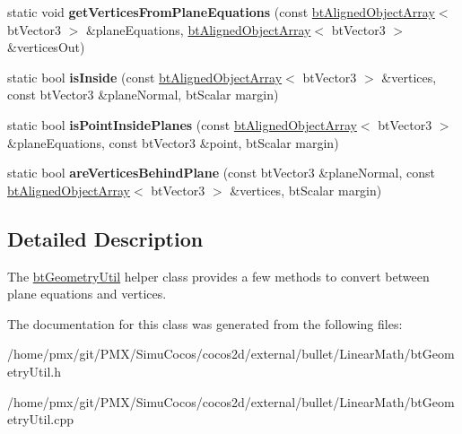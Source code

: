 \begin{DoxyCompactItemize}
\mbox{\label{classbtGeometryUtil_a6ebb88616a0cc480d88931ad0fa481b8}} 
static void {\bfseries get\+Vertices\+From\+Plane\+Equations} (const \hyperlink{classbtAlignedObjectArray}{bt\+Aligned\+Object\+Array}$<$ bt\+Vector3 $>$ \&plane\+Equations, \hyperlink{classbtAlignedObjectArray}{bt\+Aligned\+Object\+Array}$<$ bt\+Vector3 $>$ \&vertices\+Out)
\item 
\mbox{\label{classbtGeometryUtil_a2c6f6ac3418bb1790239f5483ccf1260}} 
static bool {\bfseries is\+Inside} (const \hyperlink{classbtAlignedObjectArray}{bt\+Aligned\+Object\+Array}$<$ bt\+Vector3 $>$ \&vertices, const bt\+Vector3 \&plane\+Normal, bt\+Scalar margin)
\item 
\mbox{\label{classbtGeometryUtil_af2dab175b0003b891a23069f69f12d88}} 
static bool {\bfseries is\+Point\+Inside\+Planes} (const \hyperlink{classbtAlignedObjectArray}{bt\+Aligned\+Object\+Array}$<$ bt\+Vector3 $>$ \&plane\+Equations, const bt\+Vector3 \&point, bt\+Scalar margin)
\item 
\mbox{\label{classbtGeometryUtil_acf1329c8b79f33e8f82c0f4328d66216}} 
static bool {\bfseries are\+Vertices\+Behind\+Plane} (const bt\+Vector3 \&plane\+Normal, const \hyperlink{classbtAlignedObjectArray}{bt\+Aligned\+Object\+Array}$<$ bt\+Vector3 $>$ \&vertices, bt\+Scalar margin)
\end{DoxyCompactItemize}


\subsection{Detailed Description}
The \hyperlink{classbtGeometryUtil}{bt\+Geometry\+Util} helper class provides a few methods to convert between plane equations and vertices. 

The documentation for this class was generated from the following files\+:\begin{DoxyCompactItemize}
\item 
/home/pmx/git/\+P\+M\+X/\+Simu\+Cocos/cocos2d/external/bullet/\+Linear\+Math/bt\+Geometry\+Util.\+h\item 
/home/pmx/git/\+P\+M\+X/\+Simu\+Cocos/cocos2d/external/bullet/\+Linear\+Math/bt\+Geometry\+Util.\+cpp\end{DoxyCompactItemize}
